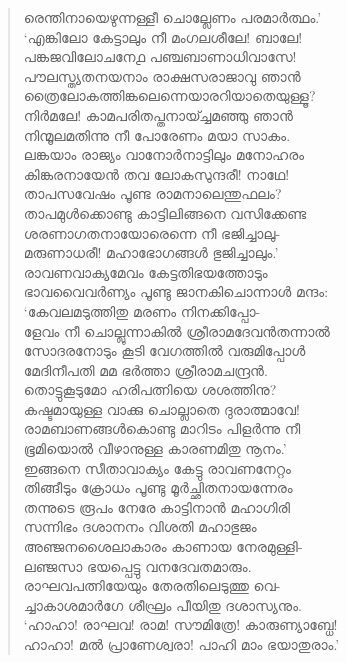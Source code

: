 \begin{verse}
രെന്തിനായെഴുന്നള്ളീ ചൊല്ലേണം പരമാര്‍ത്ഥം.’\\
‘എങ്കിലോ കേട്ടാലും നീ മംഗലശീലേ! ബാലേ!\\
പങ്കജവിലോചനേ൧ പഞ്ചബാണാധിവാസേ!\\
പൗലസ്ത്യതനയനാം രാക്ഷസരാജാവു ഞാന്‍\\
ത്രൈലോകത്തിങ്കലെന്നെയാരറിയാതെയുള്ളൂ?\\
നിര്‍മലേ! കാമപരിതപ്തനായ്ച്ചമഞ്ഞു ഞാന്‍\\
നിന്മൂലമതിന്നു നീ പോരേണം മയാ സാകം.\\
ലങ്കയാം രാജ്യം വാനോര്‍നാട്ടിലും മനോഹരം\\
കിങ്കരനായേന്‍ തവ ലോകസുന്ദരീ! നാഥേ!\\
താപസവേഷം പൂണ്ട രാമനാലെന്തുഫലം?\\
താപമുള്‍ക്കൊണ്ടു കാട്ടിലിങ്ങനെ വസിക്കേണ്ട\\
ശരണാഗതനായോരെന്നെ നീ ഭജിച്ചാലു-\\
മരുണാധരീ! മഹാഭോഗങ്ങള്‍ ഭുജിച്ചാലും.’\\
രാവണവാക്യമേവം കേട്ടതിഭയത്തോടും\\
ഭാവവൈവര്‍ണ്യം പൂണ്ടു ജാനകിചൊന്നാള്‍ മന്ദം:\\
‘കേവലമടുത്തിതു മരണം നിനക്കിപ്പോ-\\
ളേവം നീ ചൊല്ലുന്നാകില്‍ ശ്രീരാമദേവന്‍തന്നാല്‍\\
സോദരനോടും കൂടി വേഗത്തില്‍ വരുമിപ്പോള്‍\\
മേദിനീപതി മമ ഭര്‍ത്താ ശ്രീരാമചന്ദ്രന്‍.\\
തൊട്ടുകൂടുമോ ഹരിപത്നിയെ ശശത്തിനു?\\
കഷ്ടമായുള്ള വാക്കു ചൊല്ലാതെ ദുരാത്മാവേ!\\
രാമബാണങ്ങള്‍കൊണ്ടു മാറിടം പിളര്‍ന്നു നീ\\
ഭൂമിയൊല്‍ വീഴാനുള്ള കാരണമിതു നൂനം.’\\
ഇങ്ങനെ സീതാവാക്യം കേട്ടു രാവണനേറ്റം\\
തിങ്ങീടും ക്രോധം പൂണ്ടു മൂര്‍ച്ഛിതനായന്നേരം\\
തന്നുടെ രൂപം നേരേ കാട്ടിനാന്‍ മഹാഗിരി\\
സന്നിഭം ദശാനനം വിശതി മഹാഭുജം\\
അഞ്ജനശൈലാകാരം കാണായ നേരമുള്ളി-\\
ലഞ്ജസാ ഭയപ്പെട്ടു വനദേവതമാരും.\\
രാഘവപത്നിയേയും തേരതിലെടുത്തു വെ-\\
ച്ചാകാശമാര്‍ഗേ ശീഘ്രം പീയിതു ദശാസ്യനും.\\
‘ഹാഹാ! രാഘവ! രാമ! സൗമിത്രേ! കാരുണ്യാബ്ധേ!\\
ഹാഹാ! മല്‍ പ്രാണേശ്വരാ! പാഹി മാം ഭയാതുരാം.’\\

\end{verse}
